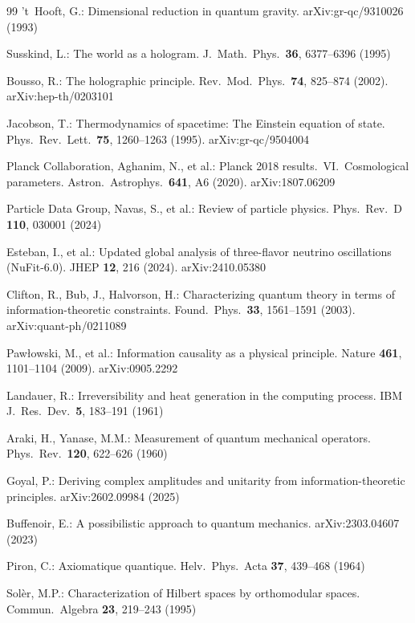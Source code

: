 \documentclass[11pt]{article}
\theoremstyle{remark}
\begin{document}
\begin{thebibliography}{99}
 't~Hooft, G.: Dimensional reduction in quantum gravity. arXiv:gr-qc/9310026 (1993)

 Susskind, L.: The world as a hologram. J.\ Math.\ Phys.\ \textbf{36}, 6377--6396 (1995)

 Bousso, R.: The holographic principle. Rev.\ Mod.\ Phys.\ \textbf{74}, 825--874 (2002). arXiv:hep-th/0203101

 Jacobson, T.: Thermodynamics of spacetime: The Einstein equation of state. Phys.\ Rev.\ Lett.\ \textbf{75}, 1260--1263 (1995). arXiv:gr-qc/9504004

 Planck Collaboration, Aghanim, N., et al.: Planck 2018 results.\ VI.\ Cosmological parameters. Astron.\ Astrophys.\ \textbf{641}, A6 (2020). arXiv:1807.06209

 Particle Data Group, Navas, S., et al.: Review of particle physics. Phys.\ Rev.\ D \textbf{110}, 030001 (2024)

 Esteban, I., et al.: Updated global analysis of three-flavor neutrino oscillations (NuFit-6.0). JHEP \textbf{12}, 216 (2024). arXiv:2410.05380

 Clifton, R., Bub, J., Halvorson, H.: Characterizing quantum theory in terms of information-theoretic constraints. Found.\ Phys.\ \textbf{33}, 1561--1591 (2003). arXiv:quant-ph/0211089

 Paw{\l}owski, M., et al.: Information causality as a physical principle. Nature \textbf{461}, 1101--1104 (2009). arXiv:0905.2292

 Landauer, R.: Irreversibility and heat generation in the computing process. IBM J.\ Res.\ Dev.\ \textbf{5}, 183--191 (1961)

 Araki, H., Yanase, M.M.: Measurement of quantum mechanical operators. Phys.\ Rev.\ \textbf{120}, 622--626 (1960)

 Goyal, P.: Deriving complex amplitudes and unitarity from information-theoretic principles. arXiv:2602.09984 (2025)

 Buffenoir, E.: A possibilistic approach to quantum mechanics. arXiv:2303.04607 (2023)

 Piron, C.: Axiomatique quantique. Helv.\ Phys.\ Acta \textbf{37}, 439--468 (1964)

 Sol\`{e}r, M.P.: Characterization of Hilbert spaces by orthomodular spaces. Commun.\ Algebra \textbf{23}, 219--243 (1995)


\end{thebibliography}
\end{document}
